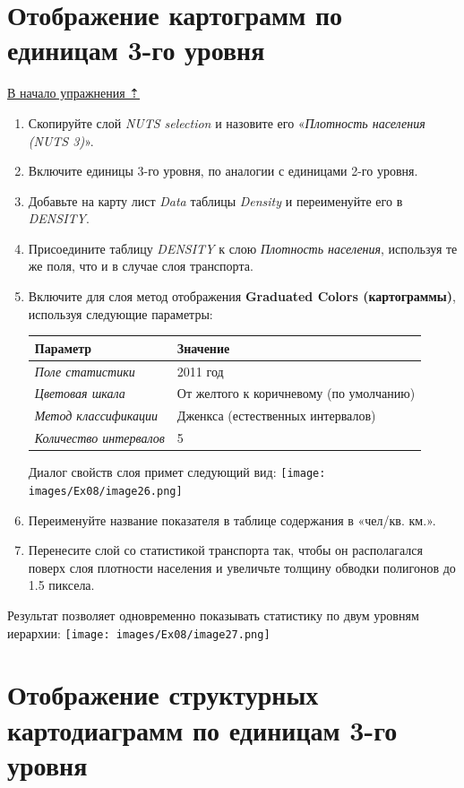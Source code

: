 \documentclass[12pt,]{book}
\begin{document}
\hypertarget{stat-map-economic-choropleths3}{%
\section{Отображение картограмм по единицам 3-го уровня}\label{stat-map-economic-choropleths3}}

\protect\hyperlink{stat-map-economic}{В начало упражнения ⇡}

\begin{enumerate}
\def\labelenumi{\arabic{enumi}.}
\item
  Скопируйте слой \emph{NUTS selection} и назовите его «\emph{Плотность населения (NUTS 3)}».
\item
  Включите единицы 3-го уровня, по аналогии с единицами 2-го уровня.
\item
  Добавьте на карту лист \emph{Data} таблицы \emph{Density} и переименуйте его в \emph{DENSITY}.
\item
  Присоедините таблицу \emph{DENSITY} к слою \emph{Плотность населения}, используя те же поля, что и в случае слоя транспорта.
\item
  Включите для слоя метод отображения \textbf{Graduated Colors (картограммы)}, используя следующие параметры:

  \begin{longtable}[]{@{}ll@{}}
  \toprule
  Параметр & Значение\tabularnewline
  \midrule
  \endhead
  \emph{Поле статистики} & 2011 год\tabularnewline
  \emph{Цветовая шкала} & От желтого к коричневому (по умолчанию)\tabularnewline
  \emph{Метод классификации} & Дженкса (естественных интервалов)\tabularnewline
  \emph{Количество интервалов} & 5\tabularnewline
  \bottomrule
  \end{longtable}

  Диалог свойств слоя примет следующий вид:
  \texttt{[image: images/Ex08/image26.png]}
\item
  Переименуйте название показателя в таблице содержания в «чел/кв. км.».
\item
  Перенесите слой со статистикой транспорта так, чтобы он располагался поверх слоя плотности населения и увеличьте толщину обводки полигонов до 1.5 пиксела.
\end{enumerate}

Результат позволяет одновременно показывать статистику по двум уровням иерархии:
\texttt{[image: images/Ex08/image27.png]}

\hypertarget{stat-map-economic-diagrams3}{%
\section{Отображение структурных картодиаграмм по единицам 3-го уровня}\label{stat-map-economic-diagrams3}}
\end{document}
